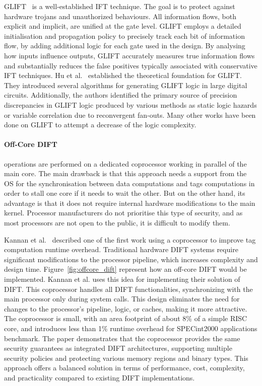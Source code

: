 GLIFT~\cite{TWMMCS-09-asplos} is a well-established IFT technique. The goal is to protect against hardware trojans and unauthorized behaviours. All information flows, both explicit and implicit, are unified at the gate level. GLIFT employs a detailed initialisation and propagation policy to precisely track each bit of information flow, by adding additional logic for each gate used in the design. By analysing how inputs influence outputs, GLIFT accurately measures true information flows and substantially reduces the false positives typically associated with conservative IFT techniques.
Hu et al.~\cite{HOITSMK-11-tcad} established the theoretical foundation for GLIFT. They introduced several algorithms for generating GLIFT logic in large digital circuits. Additionally, the authors identified the primary source of precision discrepancies in GLIFT logic produced by various methods as static logic hazards or variable correlation due to reconvergent fan-outs. Many other works have been done on GLIFT to attempt a decrease of the logic complexity.

\paragraph{Off-Core DIFT} operations are performed on a dedicated coprocessor working in parallel of the main core.
The main drawback is that this approach needs a support from the OS for the synchronisation between data computations and tags computations in order to stall one core if it needs to wait the other. But on the other hand, its advantage is that it does not require internal hardware modifications to the main kernel. Processor manufacturers do not prioritise this type of security, and as most processors are not open to the public, it is difficult to modify them.

Kannan et al.~\cite{KDK-09-dsn} described one of the first work using a coprocessor to improve tag computation runtime overhead. Traditional hardware DIFT systems require significant modifications to the processor pipeline, which increases complexity and design time. Figure~\ref{fig:offcore_dift} represent how an off-core DIFT would be implemented. Kannan et al. uses this idea for implementing their solution of DIFT.
This coprocessor handles all DIFT functionalities, synchronizing with the main processor only during system calls. This design eliminates the need for changes to the processor's pipeline, logic, or caches, making it more attractive. The coprocessor is small, with an area footprint of about 8\% of a simple RISC core, and introduces less than 1\% runtime overhead for SPECint2000 applications benchmark. The paper demonstrates that the coprocessor provides the same security guarantees as integrated DIFT architectures, supporting multiple security policies and protecting various memory regions and binary types. This approach offers a balanced solution in terms of performance, cost, complexity, and practicality compared to existing DIFT implementations.

